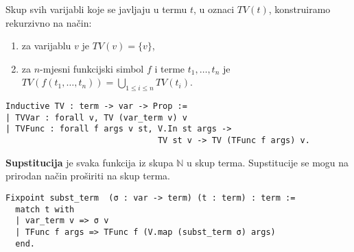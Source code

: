 \begin{definition}
  Skup svih varijabli koje se javljaju u termu \(t\), u oznaci \(\mathit{TV}(t)\), konstruiramo rekurzivno na način:
  \begin{enumerate}
  \item za varijablu \(v\) je \( \mathit{TV}(v) = \{ v \} \),
  \item za \(n\)-mjesni funkcijski simbol \(f\) i terme \(t_{1}, \ldots, t_{n}\) je \( \mathit{TV}(f(t_{1}, \ldots, t_{n})) = \bigcup_{1 \le i \le n} \mathit{TV}(t_{i}) \).
  \end{enumerate}
\begin{verbatim}
Inductive TV : term -> var -> Prop :=
| TVVar : forall v, TV (var_term v) v
| TVFunc : forall f args v st, V.In st args ->
                               TV st v -> TV (TFunc f args) v.
\end{verbatim}
\end{definition}

\begin{definition}
  \textbf{Supstitucija} je svaka funkcija iz skupa \(\mathbb{N}\) u skup terma.
  Supstitucije se mogu na prirodan način proširiti na skup terma.
\begin{verbatim}
Fixpoint subst_term  (σ : var -> term) (t : term) : term :=
  match t with
  | var_term v => σ v
  | TFunc f args => TFunc f (V.map (subst_term σ) args)
  end.
\end{verbatim}
\end{definition}

